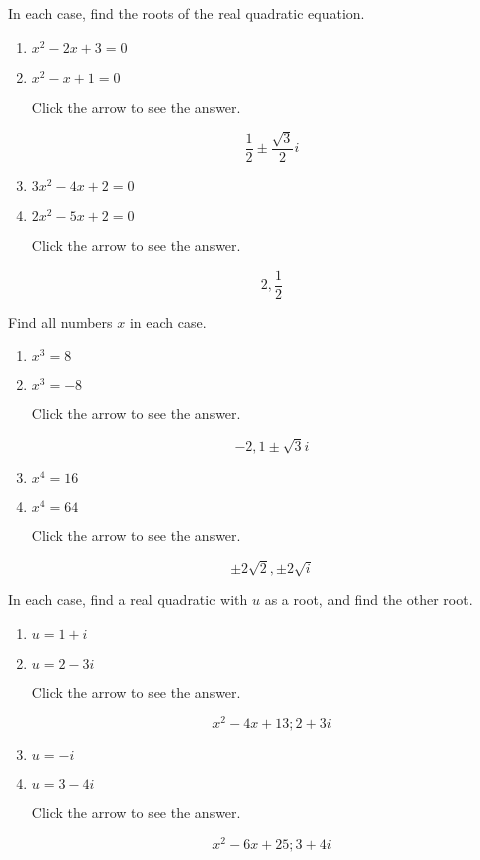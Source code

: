 \documentclass{ximera}
\begin{document}
\begin{problem}\label{prb:A.4}
In each case, find the roots of the real quadratic equation.

\begin{enumerate}
\item  $x^{2} - 2x + 3 = 0$
\item  $x^{2} - x + 1 = 0$

Click the arrow to see the answer.
\begin{expandable}
$$ \frac{1}{2} \pm \frac{\sqrt{3}}{2}i$$
\end{expandable}

\item $3x^{2} - 4x + 2 = 0$
\item  $2x^{2} - 5x + 2 = 0$

Click the arrow to see the answer.
\begin{expandable}
$$ 2, \frac{1}{2}$$
\end{expandable}
\end{enumerate}
\end{problem}

\begin{problem}\label{prb:A.5}
Find all numbers $x$ in each case.

\begin{enumerate}
\item $x^{3} = 8$
\item $x^{3} = -8$

Click the arrow to see the answer.
\begin{expandable}
$$ -2, 1 \pm \sqrt{3}i$$
\end{expandable}

\item  $x^{4} = 16$
\item  $x^{4} = 64$

Click the arrow to see the answer.
\begin{expandable}
$$ \pm 2\sqrt{2}, \pm 2\sqrt{i}$$
\end{expandable}
\end{enumerate}
\end{problem}

\begin{problem}\label{prb:A.6}
In each case, find a real quadratic with $u$ as a root, and find the other root.

\begin{enumerate}
\item  $u = 1 + i$
\item  $u = 2 - 3i$

Click the arrow to see the answer.
\begin{expandable}
$$x^{2} - 4x + 13; 2 + 3i$$
\end{expandable}

\item $u = -i$
\item $u = 3 - 4i$

Click the arrow to see the answer.
\begin{expandable}
$$ x^{2} - 6x + 25; 3 + 4i$$
\end{expandable}
\end{enumerate}
\end{problem}
\end{document}
